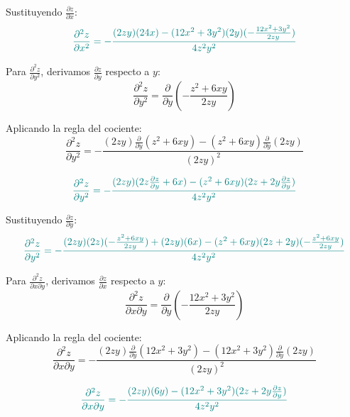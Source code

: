\documentclass{article}
\begin{document}
  Sustituyendo $\frac{\partial z}{\partial x}$:
  \begin{equation}\color{teal}
  \frac{\partial^2 z}{\partial x^2} = -\frac{(2zy)(24x) - (12x^2 + 3y^2)(2y)(-\frac{12x^2 + 3y^2}{2zy})}{4z^2y^2}
  \end{equation}
  
  
  Para $\frac{\partial^2 z}{\partial y^2}$, derivamos $\frac{\partial z}{\partial y}$ respecto a $y$:
  \begin{equation}
  \frac{\partial^2 z}{\partial y^2} = \frac{\partial}{\partial y}\left(-\frac{z^2 + 6xy}{2zy}\right)
  \end{equation}
  
  Aplicando la regla del cociente:
  \begin{equation}
  \frac{\partial^2 z}{\partial y^2} = -\frac{(2zy)\frac{\partial}{\partial y}(z^2 + 6xy) - (z^2 + 6xy)\frac{\partial}{\partial y}(2zy)}{(2zy)^2}
  \end{equation}
  
  \begin{equation}\color{teal}
  \frac{\partial^2 z}{\partial y^2} = -\frac{(2zy)(2z\frac{\partial z}{\partial y} + 6x) - (z^2 + 6xy)(2z + 2y\frac{\partial z}{\partial y})}{4z^2y^2}
  \end{equation}
  
  Sustituyendo $\frac{\partial z}{\partial y}$:
  \begin{equation}\color{teal}
  \frac{\partial^2 z}{\partial y^2} = -\frac{(2zy)(2z)(-\frac{z^2 + 6xy}{2zy}) + (2zy)(6x) - (z^2 + 6xy)(2z + 2y)(-\frac{z^2 + 6xy}{2zy})}{4z^2y^2}
  \end{equation}
  
  Para $\frac{\partial^2 z}{\partial x \partial y}$, derivamos $\frac{\partial z}{\partial x}$ respecto a $y$:
  \begin{equation}
  \frac{\partial^2 z}{\partial x \partial y} = \frac{\partial}{\partial y}\left(-\frac{12x^2 + 3y^2}{2zy}\right)
  \end{equation}
  
  Aplicando la regla del cociente:
  \begin{equation}
  \frac{\partial^2 z}{\partial x \partial y} = -\frac{(2zy)\frac{\partial}{\partial y}(12x^2 + 3y^2) - (12x^2 + 3y^2)\frac{\partial}{\partial y}(2zy)}{(2zy)^2}
  \end{equation}
  
  \begin{equation}\color{teal}
  \frac{\partial^2 z}{\partial x \partial y} = -\frac{(2zy)(6y) - (12x^2 + 3y^2)(2z + 2y\frac{\partial z}{\partial y})}{4z^2y^2}
  \end{equation}
  
\end{document}
